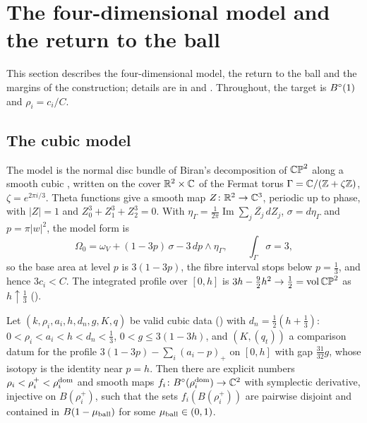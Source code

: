 \section{The four-dimensional model and the return to the ball}\label{sec:mdl}

This section describes the four-dimensional model, the return to the ball and the margins of the construction;
details are in  and . Throughout, the target is $B^{\circ}(1)$ and $\rho_i=c_i/C$.

\subsection{The cubic model}\label{sec:mdl-cub}

The model is the normal disc bundle of Biran's decomposition of $\mathbb{CP}^2$ along a smooth cubic \cite{Biran2001}, written on the cover $\mathbb{R}^2\times\mathbb{C}$ of the Fermat torus $\Gamma=\mathbb{C}/(\mathbb{Z}+\zeta\mathbb{Z})$, $\zeta=e^{2\pi i/3}$. Theta functions give a smooth map $Z\colon\mathbb{R}^2\to\mathbb{C}^3$, periodic up to phase, with $|Z|=1$ and $Z_0^3+Z_1^3+Z_2^3=0$. With $\eta_\Gamma=\frac1{2\pi}\operatorname{Im}\sum_j\overline{Z_j}\,dZ_j$, $\sigma=d\eta_\Gamma$ and $p=\pi|w|^2$, the model form is
\[
 \Omega_0=\omega_V+(1-3p)\,\sigma-3\,dp\wedge\eta_\Gamma ,\qquad \int_\Gamma\sigma=3,
\]
so the base area at level $p$ is $3(1-3p)$, the fibre interval stops below $p=\frac13$, and hence $3c_i<C$. The integrated profile over $[0,h]$ is $3h-\frac92h^2\to\frac12=\operatorname{vol}\mathbb{CP}^2$ as $h\uparrow\frac13$ ().

\begin{theorem}\label{thm:mdl-cub}
Let $(k,\rho_i,a_i,h,d_n,g,K,q)$ be valid cubic data () with $d_n=\frac12(h+\frac13)$:
$0<\rho_i<a_i<h<d_n<\frac13$, $0<g\le3(1-3h)$, and $(K,(q_t))$ a comparison datum for the profile
$3(1-3p)-\sum_i(a_i-p)_+$ on $[0,h]$ with gap $\frac{31}{32}g$, whose isotopy is the identity near $p=h$. Then there are
explicit numbers $\rho_i<\rho_i^+<\rho_i^{\rm dom}$ and smooth maps $f_i\colon B^{\circ}(\rho_i^{\rm dom})\to\mathbb{C}^2$ with symplectic
derivative, injective on $B(\rho_i^+)$, such that the sets $f_i(B(\rho_i^+))$ are pairwise disjoint and contained in
$B(1-\mu_{\rm ball})$ for some $\mu_{\rm ball}\in(0,1)$.
\end{theorem}


